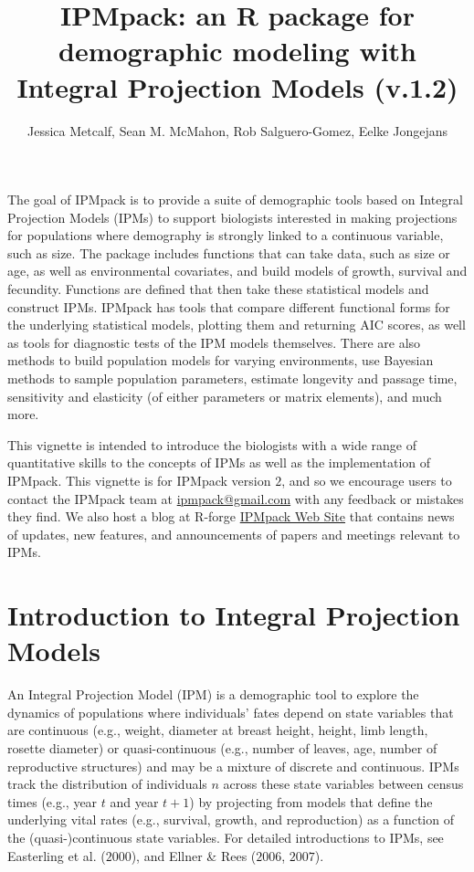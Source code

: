 \documentclass{article}
\begin{document}
\title{IPMpack: an R package for demographic modeling with Integral Projection
Models (v.1.2)}
\author{Jessica Metcalf, Sean M. McMahon, Rob Salguero-Gomez, Eelke Jongejans}
\maketitle


The goal of IPMpack is to provide a suite of demographic tools based
on Integral Projection Models (IPMs) to support biologists interested in
making projections for populations where demography is strongly linked to a continuous variable, such as size. The package includes functions that can take data, such as size or age, as well as environmental covariates, and build models of growth, survival and fecundity. Functions are defined that then take these
statistical models and construct IPMs. IPMpack has tools that compare different functional forms for the underlying statistical models, plotting them and returning AIC scores, as well as tools for diagnostic tests of the IPM models themselves. There are also methods to build population models for varying environments, use Bayesian methods to sample population parameters,  estimate longevity and passage time, sensitivity and elasticity (of either parameters or matrix elements), and much more.

This vignette is intended to introduce the biologists with a wide range of
quantitative skills to the concepts of IPMs as well as the implementation of
IPMpack.  This vignette is for IPMpack version $2$, and so we encourage users to
contact the IPMpack team at \href{ipmpack@gmail.com}{ipmpack@gmail.com} with
any feedback or mistakes they find.  We also host a blog at R-forge \href{http://ipmpack.r-forge.r-project.org/}{IPMpack Web Site} that contains news of updates, new features, and announcements of papers and meetings relevant to IPMs.
 
\newpage

\section{Introduction to Integral Projection Models}
An Integral Projection Model (IPM) is a demographic tool to explore the dynamics of populations where individuals' fates depend on state variables that are continuous (e.g., weight, diameter at breast height, height, limb length, rosette diameter) or quasi-continuous (e.g., number of leaves, age, number of reproductive structures) and may be a mixture of discrete and continuous. IPMs track the distribution of individuals $n$ across these state variables between census times (e.g., year $t$ and year $t+1$) by projecting from models that define the underlying vital rates (e.g., survival, growth, and reproduction) as a function of the (quasi-)continuous state variables. For detailed introductions to IPMs, see Easterling et al. ($2000$), and Ellner \& Rees ($2006$, $2007$). 
\end{document}
